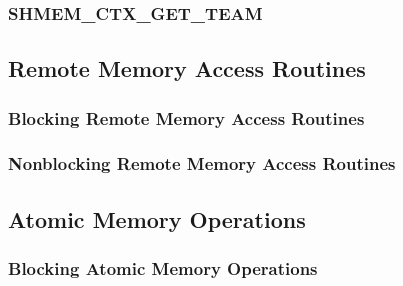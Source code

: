 \documentclass[10pt,oneside]{book}
\begin{document}
\subsubsection{\textbf{SHMEM\_CTX\_GET\_TEAM}}
\label{subsec:shmem_ctx_get_team}



\subsection{Remote Memory Access Routines}\label{sec:rma}


\subsubsection{Blocking Remote Memory Access Routines}\label{subsec:rma}
\label{subsec:shmem_put}


\label{subsec:shmem_p}


\label{subsec:shmem_iput}


\label{subsec:shmem_get}


\label{subsec:shmem_g}


\label{subsec:shmem_iget}


\subsubsection{Nonblocking Remote Memory Access Routines}\label{subsec:rma_nbi}

\label{subsec:shmem_put_nbi}


\label{subsec:shmem_get_nbi}




\subsection{Atomic Memory Operations}\label{sec:amo}


\subsubsection{Blocking Atomic Memory Operations}\label{subsec:amo}
\end{document}
